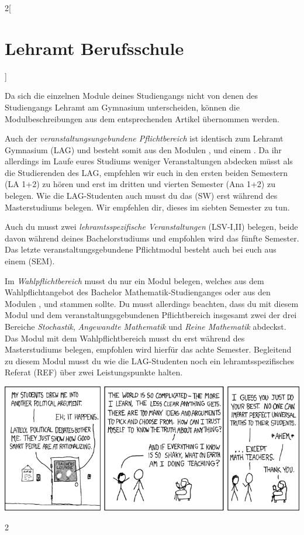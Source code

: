 \begin{multicols}{2}[\section{Lehramt Berufsschule}]

Da sich die einzelnen Module deines Studiengangs nicht von denen des
Studiengangs Lehramt am Gymnasium unterscheiden, können die Modulbeschreibungen
aus dem entsprechenden Artikel übernommen werden.

Auch der \emph{veranstaltungsungebundene Pflichtbereich} ist identisch zum
Lehramt Gymnasium (LAG) und besteht somit aus den Modulen ,
 und einem
. Da ihr allerdings im Laufe eures Studiums weniger
Veranstaltungen abdecken müsst als die Studierenden des LAG, empfehlen wir euch
in den ersten beiden Semestern  (LA 1+2) zu hören und erst im dritten und vierten Semester
 (Ana 1+2) zu belegen. Wie die LAG-Studenten auch musst du
das  (SW) erst während des Masterstudiums belegen. Wir
empfehlen dir, dieses im siebten Semester zu tun.

Auch du musst zwei \emph{lehramtsspezifische Veranstaltungen} (LSV-I,II)
belegen, beide davon während deines Bachelorstudiums und empfohlen wird das
fünfte Semester. Das letzte veranstaltungsgebundene Pflichtmodul besteht auch
bei euch aus einem  (SEM).

Im \emph{Wahlpflichtbereich} musst du nur ein Modul belegen, welches aus dem
Wahlpflichtangebot des Bachelor Mathematik-Studienganges oder aus den Modulen
,  und  stammen sollte. Du musst allerdings beachten, dass du mit diesem
Modul und dem veranstaltungsgebundenen Pflichtbereich insgesamt zwei der drei
Bereiche \emph{Stochastik}, \emph{Angewandte Mathematik} und \emph{Reine
Mathematik} abdeckst. Das Modul mit dem Wahlpflichtbereich musst du erst
während des Masterstudiums belegen, empfohlen wird hierfür das achte Semester.
Begleitend zu diesem Modul musst du wie die LAG-Studenten noch ein
lehramtsspezifisches Referat (REF) über zwei Leistungspunkte halten.

\end{multicols}
\begin{center}
\includegraphics[scale=7]{comics/263}
\end{center}
\begin{multicols}{2}

\end{multicols}
\clearpage

